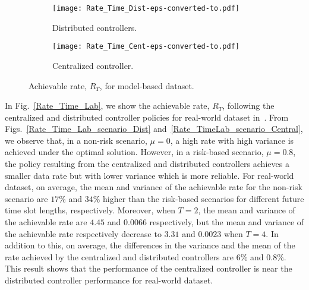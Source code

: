 \documentclass[conference]{IEEEtran}
\begin{document}
\begin{figure}[ht]
\begin{subfigure}{.5\textwidth}
  \centering
  \texttt{[image: Rate\_Time\_Dist-eps-converted-to.pdf]}
  \caption{Distributed controllers.}
  \label{Rate_Time_Dist}
\end{subfigure}
\begin{subfigure}{.5\textwidth}
  \centering
 \texttt{[image: Rate\_Time\_Cent-eps-converted-to.pdf]}
  \caption{Centralized controller.}
  \label{Rate_Time_Cent}
\end{subfigure}
\caption{Achievable rate, $R_T$, for model-based dataset.}\label{Rate_Time}
\end{figure}

In Fig.~\ref{Rate_Time_Lab}, we show the achievable rate, $R_T$, following the centralized and distributed controller policies for real-world dataset in~\cite{dataset}. From Figs.~\ref{Rate_Time_Lab_scenario_Dist} and~\ref{Rate_TimeLab_scenario_Central}, we observe that, in a non-risk scenario, $\mu=0$, a high rate with high variance is achieved under the optimal solution. However, in a risk-based scenario, $\mu=0.8$, the policy resulting from the centralized and distributed controllers achieves a smaller data rate but with lower variance which is more reliable. For real-world dataset, on average, the mean and variance of the achievable rate for the non-risk scenario are $17\%$ and $34\%$ higher than the risk-based scenarios for different future time slot lengths, respectively. Moreover, when $T=2$, the mean and variance of the achievable rate are $4.45$ and $0.0066$ respectively, but the mean and variance of the achievable rate respectively decrease to $3.31$ and $0.0023$ when $T=4$. In addition to this, on average, the differences in the variance and the mean of the rate achieved by the centralized and distributed controllers  are $6\%$ and $0.8\%$. This result shows that the performance of the centralized controller is near the distributed controller performance for real-world dataset.
\end{document}
